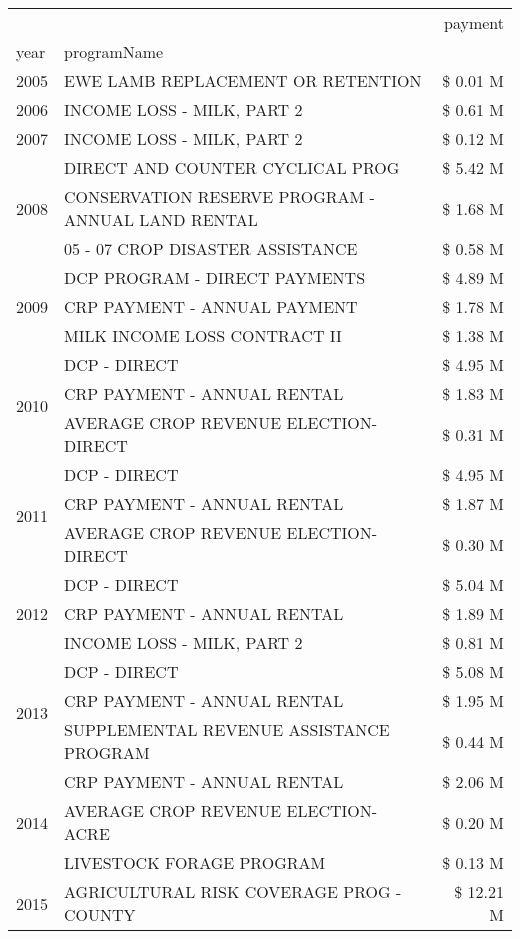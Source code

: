 \begin{tabular}{llr}
\toprule
 &  & payment \\
year & programName &  \\
\midrule
2005 & EWE LAMB REPLACEMENT OR RETENTION & \$ 0.01 M \\
\cline{1-3}
2006 & INCOME LOSS - MILK, PART 2 & \$ 0.61 M \\
\cline{1-3}
2007 & INCOME LOSS - MILK, PART 2 & \$ 0.12 M \\
\cline{1-3}
\multirow[t]{3}{*}{2008} & DIRECT AND COUNTER CYCLICAL PROG & \$ 5.42 M \\
 & CONSERVATION RESERVE PROGRAM - ANNUAL LAND RENTAL & \$ 1.68 M \\
 & 05 - 07 CROP DISASTER ASSISTANCE & \$ 0.58 M \\
\cline{1-3}
\multirow[t]{3}{*}{2009} & DCP PROGRAM - DIRECT PAYMENTS & \$ 4.89 M \\
 & CRP PAYMENT - ANNUAL PAYMENT & \$ 1.78 M \\
 & MILK INCOME LOSS CONTRACT II & \$ 1.38 M \\
\cline{1-3}
\multirow[t]{3}{*}{2010} & DCP - DIRECT & \$ 4.95 M \\
 & CRP PAYMENT - ANNUAL RENTAL & \$ 1.83 M \\
 & AVERAGE CROP REVENUE ELECTION-DIRECT & \$ 0.31 M \\
\cline{1-3}
\multirow[t]{3}{*}{2011} & DCP - DIRECT & \$ 4.95 M \\
 & CRP PAYMENT - ANNUAL RENTAL & \$ 1.87 M \\
 & AVERAGE CROP REVENUE ELECTION-DIRECT & \$ 0.30 M \\
\cline{1-3}
\multirow[t]{3}{*}{2012} & DCP - DIRECT & \$ 5.04 M \\
 & CRP PAYMENT - ANNUAL RENTAL & \$ 1.89 M \\
 & INCOME LOSS - MILK, PART 2 & \$ 0.81 M \\
\cline{1-3}
\multirow[t]{3}{*}{2013} & DCP - DIRECT & \$ 5.08 M \\
 & CRP PAYMENT - ANNUAL RENTAL & \$ 1.95 M \\
 & SUPPLEMENTAL REVENUE ASSISTANCE PROGRAM & \$ 0.44 M \\
\cline{1-3}
\multirow[t]{3}{*}{2014} & CRP PAYMENT - ANNUAL RENTAL & \$ 2.06 M \\
 & AVERAGE CROP REVENUE ELECTION-ACRE & \$ 0.20 M \\
 & LIVESTOCK FORAGE PROGRAM & \$ 0.13 M \\
\cline{1-3}
\multirow[t]{3}{*}{2015} & AGRICULTURAL RISK COVERAGE PROG - COUNTY & \$ 12.21 M \\

\end{tabular}
